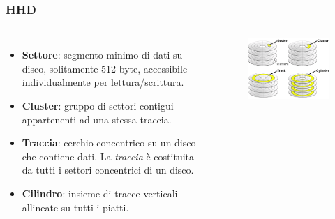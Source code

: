 \begin{frame}
	\frametitle{HHD}
	 

	\begin{columns}			
		\begin{itemize}
			
			\item \textbf{Settore}: segmento minimo di dati su disco, solitamente 512 byte, accessibile individualmente per lettura/scrittura. 
			\item \textbf{Cluster}: gruppo di settori contigui appartenenti ad una stessa traccia.
			\item \textbf{Traccia}: cerchio concentrico su un disco che contiene dati. La \textit{traccia} è costituita da tutti i settori concentrici di un disco.
			\item \textbf{Cilindro}: insieme di tracce verticali allineate su tutti i piatti.
		\end{itemize}

		\begin{figure}[!htbp]
			\centering
			\includegraphics[width=1.0\linewidth]{images/5_memory/hdd_info_3.png}
		\end{figure}
	\end{columns}
	
\end{frame}





